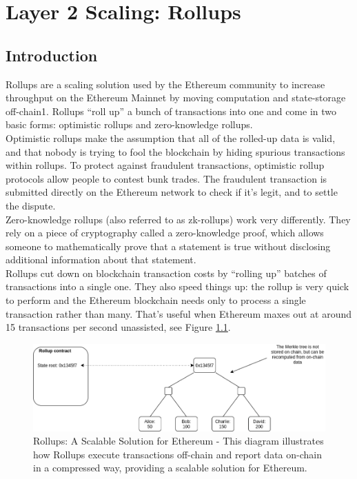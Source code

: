 \chapter{Layer 2 Scaling: Rollups}

\section{Introduction}
Rollups are a scaling solution used by the Ethereum community to increase throughput on the Ethereum Mainnet by moving computation and state-storage off-chain1. Rollups “roll up” a bunch of transactions into one and come in two basic forms: optimistic rollups and zero-knowledge rollups.\\
Optimistic rollups make the assumption that all of the rolled-up data is valid, and that nobody is trying to fool the blockchain by hiding spurious transactions within rollups. To protect against fraudulent transactions, optimistic rollup protocols allow people to contest bunk trades. The fraudulent transaction is submitted directly on the Ethereum network to check if it’s legit, and to settle the dispute.\\
Zero-knowledge rollups (also referred to as zk-rollups) work very differently. They rely on a piece of cryptography called a zero-knowledge proof, which allows someone to mathematically prove that a statement is true without disclosing additional information about that statement.\\
Rollups cut down on blockchain transaction costs by “rolling up” batches of transactions into a single one. They also speed things up: the rollup is very quick to perform and the Ethereum blockchain needs only to process a single transaction rather than many. That’s useful when Ethereum maxes out at around 15 transactions per second unassisted, see Figure \ref{fig:L14_f1}.
\begin{center}
	\begin{figure}
		\centering
		\includegraphics[width=0.8\linewidth]{Fig/14/F1}
		\caption{Rollups: A Scalable Solution for Ethereum - This diagram illustrates how Rollups execute transactions off-chain and report data on-chain in a compressed way, providing a scalable solution for Ethereum.
		}
		\label{fig:L14_f1}
	\end{figure}
\end{center}
